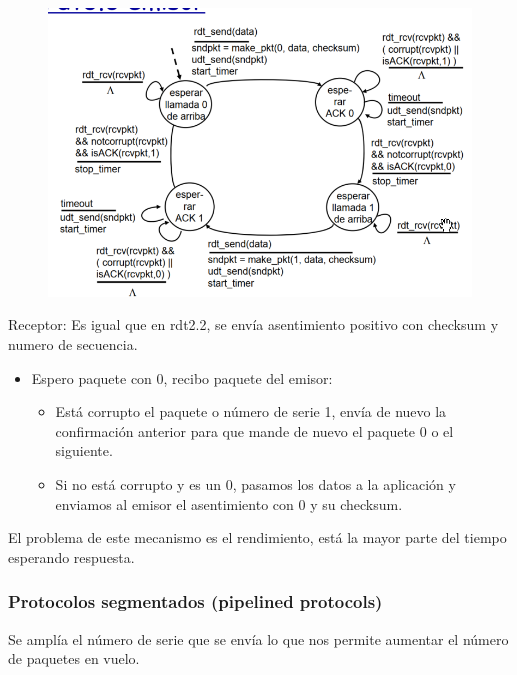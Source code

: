 \documentclass[12pt, twoside, openright]{report} %
\begin{document}
\begin{figure}[H]
	{\includegraphics[scale=.45]{Untitled 15.png}}
\end{figure}
\pagebreak
Receptor: Es igual que en rdt2.2, se envía asentimiento positivo
con checksum y numero de secuencia.

\begin{itemize}
	\item Espero paquete con 0, recibo paquete del emisor:

	      \begin{itemize}
		      \item Está corrupto el paquete o número de serie 1, envía de nuevo
		            la confirmación anterior para que mande de nuevo el paquete 0
		            o el siguiente.
		      \item Si no está corrupto y es un 0, pasamos los datos a la
		            aplicación y enviamos al emisor el asentimiento con 0 y su
		            checksum.
	      \end{itemize}
\end{itemize}

El problema de este mecanismo es el rendimiento, está la mayor
parte del tiempo esperando respuesta.


\subsubsection{Protocolos segmentados (pipelined protocols)}



Se amplía el número de serie que se envía lo que nos permite
aumentar el número de paquetes en vuelo.
\end{document}
